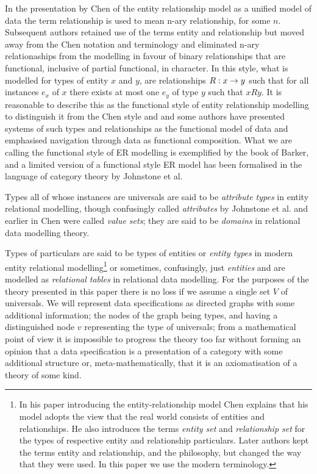 \documentclass[10pt,a4paper]{article}
\newcommand{\veee}{v}
\newcommand{\Veee}{V}
\begin{document}
In the presentation by Chen of the
 entity relationship model as a unified model of data the term relationship is used 
to mean n-ary relationship, for some $n$. Subsequent authors retained use of the terms entity and relationship
but moved away from the Chen notation and terminology and eliminated n-ary relationaships from the modelling
in favour of binary relationships that are functional, inclusive of partial functional,  in character.
In this style, what is modelled  for  types of entity $x$ and $y$, are  relationships $R: x \rightarrow y$ such that for all instances $e_x$ of $x$
there exists at most one $e_y$ of type $y$ such that $x R y$. It is reasonable to describe this   as the functional style of entity relationship modelling to distinguish it from the Chen style and
and some authors have presented  systems of such types and relationships as the functional model of data and emphasised navigation through data as functional composition. What we are calling the functional style of ER modelling is exemplified by the
book of Barker, and a limited version of a functional style ER model has been formalised in the language of category theory by Johnstone et al. 

Types all of whose instances are universals  are said to be \textit{attribute types} in entity relational 
modelling, though confusingly called \textit{attributes} by Johnstone et al. and earlier
in Chen were called \textit{value sets}; they are said to be \textit{domains} in relational data modelling theory. 

Types of particulars are said to be 
types of entities or \textit{entity types} in modern entity relational modelling\footnote{In  his paper  introducing the entity-relationship model Chen explains that his model adopts the view that the real world consists of entities and relationships. He also introduces the  terms \textit{entity set} and \textit{relationship set} for the types of respective entity and relationship particulars. Later authors kept the terms entity and relationship, and the philosophy, but changed the way that they were used. In this paper we use the modern terminology.} or sometimes, confusingly, just \textit{entities}  and 
are modelled as \textit{relational tables} in relational data modelling. For the purposes of the theory presented in this paper there is no loss if we assume a single set $\Veee$ of universals.  We will represent data specifications as directed graphs with 
some additional information; the nodes of the graph being types, and having a distinguished node $\veee$ representing the type of universals; from a mathematical point of view it is impossible to progress the theory too far without forming an opinion that a data specification is a presentation of a category with some additional structure or, meta-mathematically, that it is an axiomatisation of a theory of some kind. 
\end{document}
